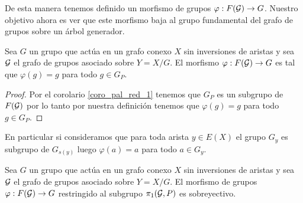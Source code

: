 \documentclass[tesis.tex]{subfiles}
\begin{document}
De esta manera tenemos definido un morfismo de grupos $\varphi: F({\cal G}) \to G$.
Nuestro objetivo ahora es ver que este morfismo baja al grupo fundamental del grafo de grupos sobre un árbol generador.

\begin{lema}\label{lema_morfismo_pi1_inyectivo}
	Sea $G$ un grupo que actúa en un grafo conexo $X$ sin inversiones de aristas y sea ${\cal G}$ el grafo de grupos asociado sobre $Y = X / G$.
	El morfismo $\varphi:F({\cal G}) \to G$ es tal que $\varphi(g) = g$ para todo $g \in G_{P}$.
\end{lema}

\begin{proof}
	Por el corolario \ref{coro_pal_red_1} tenemos que $G_{P}$ es un subgrupo de $F({\cal G})$ por lo tanto por nuestra definición tenemos que $\varphi(g) = g$ para todo $g \in G_{P}$.
\end{proof}

En particular si consideramos que para toda arista $y \in E(X)$ el grupo $G_y$ es subgrupo de $G_{s(y)}$ luego $\varphi(a) = a$ para todo $a \in G_{y}$.

\begin{prop}\label{prop_morf_grp_restr_sobre}
	Sea $G$ un grupo que actúa en un grafo conexo $X$ sin inversiones de aristas y sea ${\cal G}$ el grafo de grupos asociado sobre $Y = X / G$.
	El morfismo de grupos $\varphi: F({\cal G}) \to G$ restringido al subgrupo $\pi_1({\cal G}, P)$ es sobreyectivo.
\end{prop}
\end{document}
